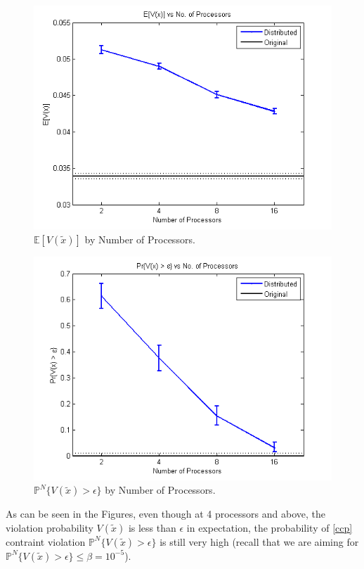 \documentclass[12pt]{article}
\begin{document}
\begin{figure}[ht]
	\centering
		\includegraphics[scale=0.9]{../plot/figs/expviolprob_numproc.png}
	\caption{$\mathbb{E}[V(\tilde{x})]$ by Number of Processors.}
	\label{fig:expviolprob_numproc}
\end{figure}

\begin{figure}[ht]
	\centering
		\includegraphics[scale=0.9]{../plot/figs/probviolprobgreateps_numproc.png}
	\caption{$\mathbb{P}^N\{V(\tilde{x}) > \epsilon \}$ by Number of Processors.}
	\label{fig:probviolprobgreateps_numproc}
\end{figure}

As can be seen in the Figures, even though at 4 processors and above, the violation probability $V(\tilde{x})$ is less than $\epsilon$ in expectation, the probability of \ref{ccp} contraint violation $\mathbb{P}^N\{V(\tilde{x}) > \epsilon \}$ is still very high (recall that we are aiming for $\mathbb{P}^N\{V(\tilde{x}) > \epsilon \} \leq \beta = 10^{-5}$).
\end{document}
